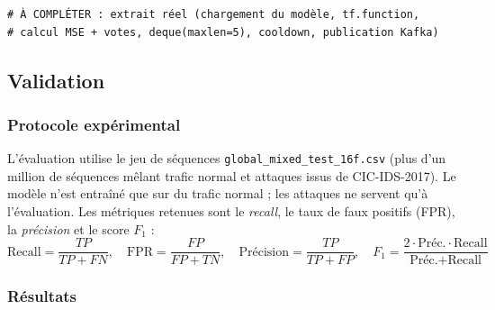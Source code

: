 
\begin{lstlisting}[style=ngidps, caption={Extrait de \texttt{realtime\_interface.py} : décision OR-Gate et filtre de persistance}, label={lst:realtime}]
# À COMPLÉTER : extrait réel (chargement du modèle, tf.function,
# calcul MSE + votes, deque(maxlen=5), cooldown, publication Kafka)
\end{lstlisting}



\subsection{Validation}

\subsubsection{Protocole expérimental}

L'évaluation utilise le jeu de séquences \texttt{global\_mixed\_test\_16f.csv} (plus d'un million de séquences mêlant trafic normal et attaques issus de CIC-IDS-2017). Le modèle n'est entraîné que sur du trafic normal ; les attaques ne servent qu'à l'évaluation. Les métriques retenues sont le \emph{recall}, le taux de faux positifs (FPR), la \emph{précision} et le score $F_1$ :
\begin{equation}
\text{Recall}=\frac{TP}{TP+FN},\quad \text{FPR}=\frac{FP}{FP+TN},\quad \text{Précision}=\frac{TP}{TP+FP},\quad F_1=\frac{2\cdot \text{Préc.}\cdot \text{Recall}}{\text{Préc.}+\text{Recall}}
\label{eq:metriques}
\end{equation}

\subsubsection{Résultats}

